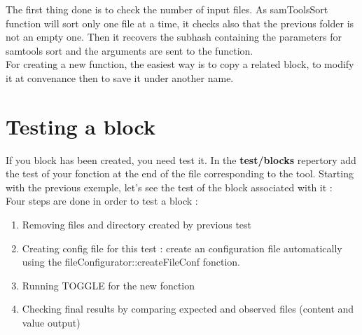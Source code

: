 \documentclass[a4paper,10pt]{report}
\begin{document}
The first thing done is to check the number of input files. As samToolsSort function will sort only one file at a time, it checks also that the previous folder is not an empty one. Then it recovers the subhash containing the parameters for samtools sort and the arguments are sent to the function.\\

For creating a new function, the easiest way is to copy a related block, to modify it at convenance then to save it under another name.


\section{Testing a block}

If you block has been created, you need test it. In the \textbf{test/blocks} repertory add the test of your fonction at the end of the file corresponding to the tool. Starting with the previous exemple, let's see the test of the block associated with it : \\


\noindent Four steps are done in order to test a block  :

\begin{enumerate}
\item Removing files and directory created by previous test
\item Creating config file for this test : create an configuration file automatically using the fileConfigurator::createFileConf fonction.
\item Running TOGGLE for the new fonction
\item Checking final results by comparing expected and observed files (content and value output)
\end{enumerate}
\end{document}
